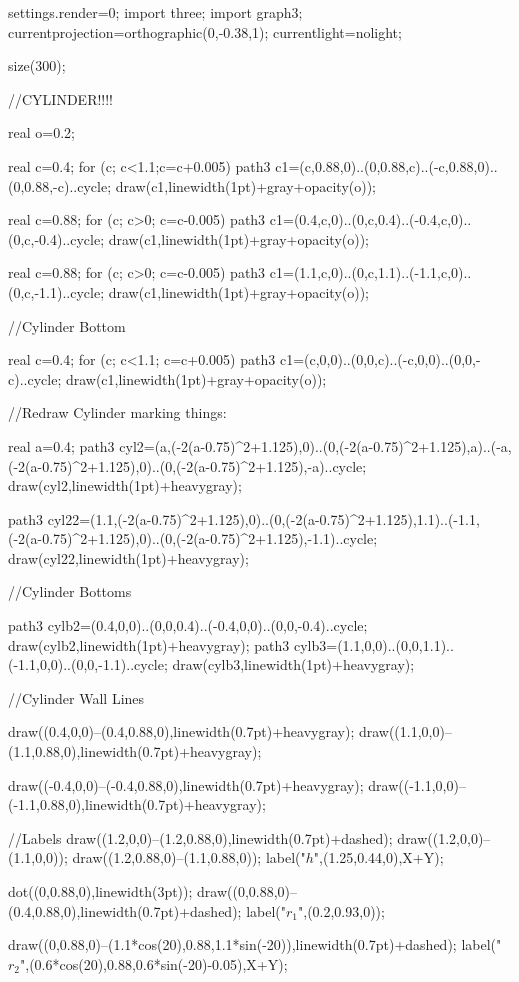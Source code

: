 
  	settings.render=0;
	import three;
    import graph3;
    currentprojection=orthographic(0,-0.38,1);
    currentlight=nolight;

	size(300);
    
    
    //CYLINDER!!!!
    
    real o=0.2;
    

    real c=0.4;
    for (c; c<1.1;c=c+0.005)
    {
        path3 c1=(c,0.88,0)..(0,0.88,c)..(-c,0.88,0)..(0,0.88,-c)..cycle;
    	draw(c1,linewidth(1pt)+gray+opacity(o));
    }
        
   	real c=0.88;
    for (c; c>0; c=c-0.005)
    {
        path3 c1=(0.4,c,0)..(0,c,0.4)..(-0.4,c,0)..(0,c,-0.4)..cycle;
    	draw(c1,linewidth(1pt)+gray+opacity(o));
    }
    	
    real c=0.88;
    for (c; c>0; c=c-0.005)
    {
        path3 c1=(1.1,c,0)..(0,c,1.1)..(-1.1,c,0)..(0,c,-1.1)..cycle;
    	draw(c1,linewidth(1pt)+gray+opacity(o));
    }
        

   //Cylinder Bottom
    
    real c=0.4;
    for (c; c<1.1; c=c+0.005)
    {
        path3 c1=(c,0,0)..(0,0,c)..(-c,0,0)..(0,0,-c)..cycle;
    	draw(c1,linewidth(1pt)+gray+opacity(o));
    }
    
	//Redraw Cylinder marking things:
	
   	real a=0.4;
		path3 cyl2=(a,(-2(a-0.75)^2+1.125),0)..(0,(-2(a-0.75)^2+1.125),a)..(-a,(-2(a-0.75)^2+1.125),0)..(0,(-2(a-0.75)^2+1.125),-a)..cycle;
    	draw(cyl2,linewidth(1pt)+heavygray);
    	
    path3 cyl22=(1.1,(-2(a-0.75)^2+1.125),0)..(0,(-2(a-0.75)^2+1.125),1.1)..(-1.1,(-2(a-0.75)^2+1.125),0)..(0,(-2(a-0.75)^2+1.125),-1.1)..cycle;
    	draw(cyl22,linewidth(1pt)+heavygray);

	//Cylinder Bottoms
	
    path3 cylb2=(0.4,0,0)..(0,0,0.4)..(-0.4,0,0)..(0,0,-0.4)..cycle;
    	draw(cylb2,linewidth(1pt)+heavygray);
    path3 cylb3=(1.1,0,0)..(0,0,1.1)..(-1.1,0,0)..(0,0,-1.1)..cycle;
    	draw(cylb3,linewidth(1pt)+heavygray);

   	//Cylinder Wall Lines

   		draw((0.4,0,0)--(0.4,0.88,0),linewidth(0.7pt)+heavygray);
   		draw((1.1,0,0)--(1.1,0.88,0),linewidth(0.7pt)+heavygray);
		
   		draw((-0.4,0,0)--(-0.4,0.88,0),linewidth(0.7pt)+heavygray);
   		draw((-1.1,0,0)--(-1.1,0.88,0),linewidth(0.7pt)+heavygray);

	//Labels
		draw((1.2,0,0)--(1.2,0.88,0),linewidth(0.7pt)+dashed);
		draw((1.2,0,0)--(1.1,0,0));
		draw((1.2,0.88,0)--(1.1,0.88,0));
		label("$h$",(1.25,0.44,0),X+Y);
		
		dot((0,0.88,0),linewidth(3pt));
		draw((0,0.88,0)--(0.4,0.88,0),linewidth(0.7pt)+dashed);
		label("$r_1$",(0.2,0.93,0));
		
		draw((0,0.88,0)--(1.1*cos(20),0.88,1.1*sin(-20)),linewidth(0.7pt)+dashed);
		label("$r_2$",(0.6*cos(20),0.88,0.6*sin(-20)-0.05),X+Y);